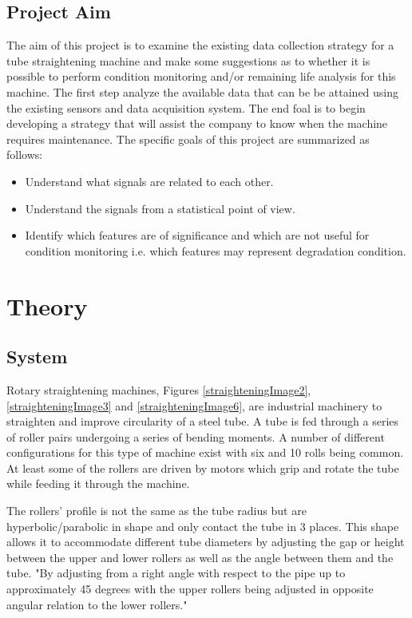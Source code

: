 \documentclass{article}
\begin{document}
\subsection{Project Aim}
The aim of this project is to examine the existing data collection strategy for a tube straightening machine and make some suggestions as to whether it is possible to perform condition monitoring and/or remaining life analysis for this machine. The first step analyze the available data that can be be attained using the existing sensors and data acquisition system. The end foal is to begin developing a strategy that will assist the company to know when the machine requires maintenance. The specific goals of this project are summarized as follows:
\begin{itemize}
\item Understand what signals are related to each other.
\item Understand the signals from a statistical point of view.
\item Identify which features are of significance and which are not useful for condition monitoring i.e. which features may represent degradation condition.
\end{itemize}
\clearpage  
\section{Theory}
\subsection{System}
Rotary straightening machines, Figures \ref{straighteningImage2}, \ref{straighteningImage3} and \ref{straighteningImage6}, are industrial machinery to straighten and improve circularity of a steel tube. A tube is fed through a series of roller pairs undergoing a series of bending moments. A number of different configurations for this type of machine exist with six and 10 rolls being common. At least some of the rollers are driven by motors which grip and rotate the tube while feeding it through the machine.

The rollers' profile is not the same as the tube radius but are hyperbolic/parabolic in shape and only contact the tube in 3 places. This shape allows it to accommodate different tube diameters by adjusting the gap or height between the upper and lower rollers as well as the angle between them and the tube. "By adjusting from a right angle with respect to the pipe up to approximately 45 degrees with the upper rollers being adjusted in opposite angular relation to the lower rollers."
\end{document}
